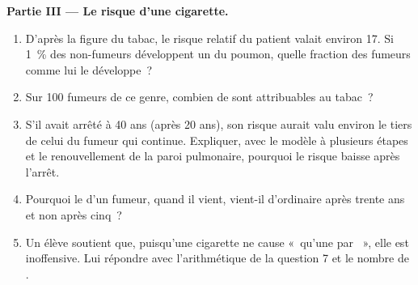 \begin{problem}
\medskip
\noindent\textbf{Partie III --- Le risque d'une cigarette.}
\begin{enumerate}[resume]
  \item D'après la figure du tabac, le risque relatif du patient valait
        environ 17. Si 1~\% des non-fumeurs développent un  du
        poumon, quelle fraction des fumeurs comme lui le développe~?
  \item Sur 100 fumeurs de ce genre, combien de  sont
        attribuables au tabac~?
  \item S'il avait arrêté à 40 ans (après 20 ans), son risque aurait
        valu environ le tiers de celui du fumeur qui continue.
        Expliquer, avec le modèle à plusieurs étapes et le
        renouvellement de la paroi pulmonaire, pourquoi le risque baisse
        après l'arrêt.
  \item Pourquoi le  d'un fumeur, quand il vient, vient-il
        d'ordinaire après trente ans et non après cinq~?
  \item Un élève soutient que, puisqu'une cigarette ne cause
        «~qu'une  par ~», elle est inoffensive. Lui
        répondre avec l'arithmétique de la question 7 et le nombre de
        .
\end{enumerate}


\end{problem}
